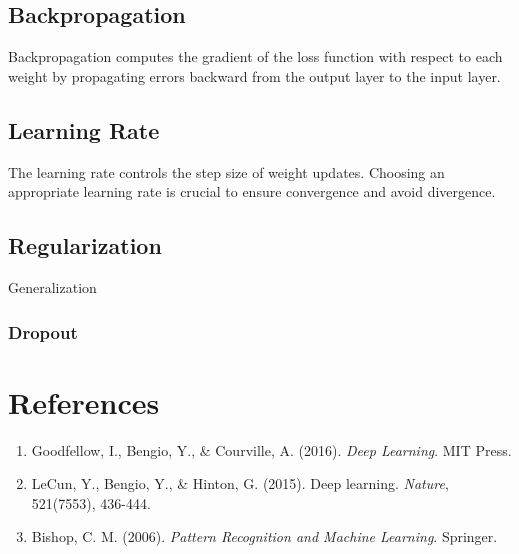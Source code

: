 \documentclass[a4paper,12pt]{article}
\begin{document}
\subsection{Backpropagation}
Backpropagation computes the gradient of the loss function with respect to each weight by propagating 
errors backward from the output layer to the input layer.

\subsection{Learning Rate}
The learning rate controls the step size of weight updates. Choosing an appropriate learning rate is 
crucial to ensure convergence and avoid divergence.

\subsection{Regularization}
Generalization

\subsubsection{Dropout}

\section{References}
\begin{enumerate}
  \item Goodfellow, I., Bengio, Y., \& Courville, A. (2016). \textit{Deep Learning}. MIT Press.
  \item LeCun, Y., Bengio, Y., \& Hinton, G. (2015). Deep learning. \textit{Nature}, 521(7553), 436-444.
  \item Bishop, C. M. (2006). \textit{Pattern Recognition and Machine Learning}. Springer.
\end{enumerate}
\end{document}
